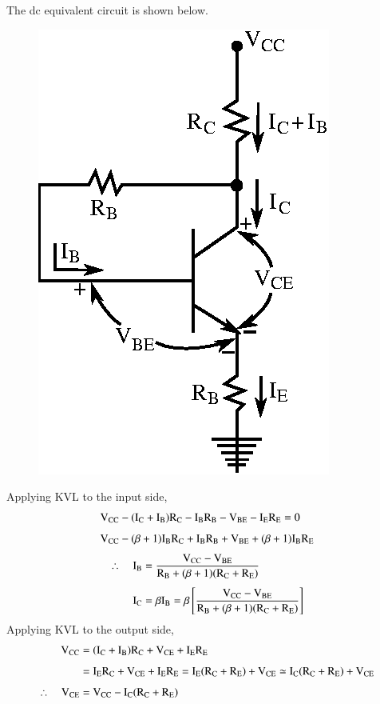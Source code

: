 \begin{solution}
The dc equivalent circuit is shown below.
\begin{figure}[H]
\centering
\includegraphics{chap3/fig3.15.eps}
\end{figure}

Applying KVL to the input side,
\begin{align*}
& \textrm{V}_{\text{CC}}-(\textrm{I}_{\textrm{C}}+\textrm{I}_{\textrm{B}})\textrm{R}_{\textrm{C}}-\textrm{I}_{\textrm{B}}\textrm{R}_{\textrm{B}}-\textrm{V}_{\text{BE}}-\textrm{I}_{\textrm{E}}\textrm{R}_{\textrm{E}}=0\\[4pt]
& \textrm{V}_{\text{CC}}-(\beta+1)\textrm{I}_{\textrm{B}}\textrm{R}_{\textrm{C}}+\textrm{I}_{\textrm{B}}\textrm{R}_{\textrm{B}}+\textrm{V}_{\text{BE}}+(\beta+1)\textrm{I}_{\textrm{B}}\textrm{R}_{\textrm{E}}
\end{align*}
\begin{align*}
\therefore\quad \textrm{I}_{\textrm{B}} &= \frac{\textrm{V}_{\text{CC}}-\textrm{V}_{\text{BE}}}{\textrm{R}_{\textrm{B}}+(\beta+1)(\textrm{R}_{\textrm{C}}+\textrm{R}_{\textrm{E}})}\\[4pt]
\textrm{I}_{\textrm{C}} &= \beta \textrm{I}_{\textrm{B}}=\beta\left[\frac{\textrm{V}_{\text{CC}}-\textrm{V}_{\text{BE}}}{\textrm{R}_{\textrm{B}}+(\beta+1)(\textrm{R}_{\textrm{C}}+\textrm{R}_{\textrm{E}})}\right]
\end{align*}
Applying KVL to the output side,
\begin{align*}
\textrm{V}_{\text{CC}} &= (\textrm{I}_{\textrm{C}}+\textrm{I}_{\textrm{B}})\textrm{R}_{\textrm{C}}+\textrm{V}_{\text{CE}}+\textrm{I}_{\textrm{E}}\textrm{R}_{\textrm{E}}\\[4pt]
&= \textrm{I}_{\textrm{E}}\textrm{R}_{\textrm{C}}+\textrm{V}_{\text{CE}}+\textrm{I}_{\textrm{E}}\textrm{R}_{\textrm{E}}=\textrm{I}_{\textrm{E}}(\textrm{R}_{\textrm{C}}+\textrm{R}_{\textrm{E}})+\textrm{V}_{\text{CE}}\simeq \textrm{I}_{\textrm{C}}(\textrm{R}_{\textrm{C}}+\textrm{R}_{\textrm{E}})+\textrm{V}_{\text{CE}}\\[4pt]
\therefore\quad \textrm{V}_{\text{CE}} &= \textrm{V}_{\text{CC}}-\textrm{I}_{\textrm{C}}(\textrm{R}_{\textrm{C}}+\textrm{R}_{\textrm{E}})
\end{align*}
\end{solution}

